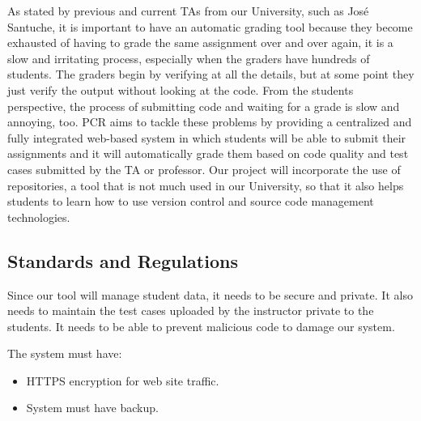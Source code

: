 As stated by previous and current TAs from our University, such as José
Santuche, it is important to have an automatic grading tool because they become
exhausted of having to grade the same assignment over and over again, it is a
slow and irritating process, especially when the graders have hundreds of
students. The graders begin by verifying at all the details, but at some point
they just verify the output without looking at the code. From the students
perspective, the process of submitting code and waiting for a grade is slow and
annoying, too. PCR aims to tackle these problems by providing a centralized and
fully integrated web-based system in which students will be able to submit their
assignments and it will automatically grade them based on code quality and test
cases submitted by the TA or professor. Our project will incorporate the use of
repositories, a tool that is not much used in our University, so that it also
helps students to learn how to use version control and source code management
technologies.

\subsection{Standards and Regulations}

Since our tool will manage student data, it needs to be secure and private. It
also needs to maintain the test cases uploaded by the instructor private to the
students. It needs to be able to prevent malicious code to damage our system.

The system must have:
\begin{itemize}
\item HTTPS encryption for web site traffic.
\item System must have backup. %
\end{itemize}

